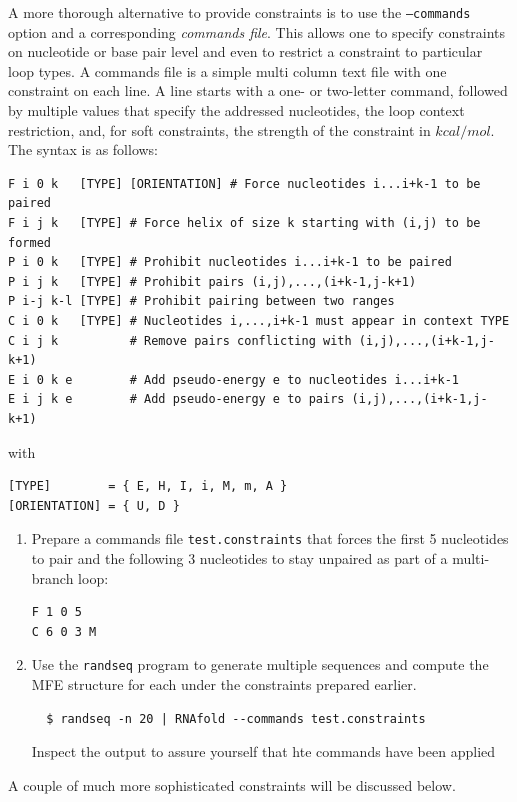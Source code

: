 \documentclass[a4paper]{article}
\begin{document}
A more thorough alternative to provide constraints is to use the \texttt{--commands} option
and a corresponding \textit{commands file}. This allows one to specify constraints on nucleotide
or base pair level and even to restrict a constraint to particular loop types. A commands file
is a simple multi column text file with one constraint on each line. A line starts with a one- or
two-letter command, followed by multiple values that specify the addressed nucleotides, the loop
context restriction, and, for soft constraints, the strength of the constraint in $kcal/mol$.
The syntax is as follows:

{\footnotesize
\begin{verbatim}
F i 0 k   [TYPE] [ORIENTATION] # Force nucleotides i...i+k-1 to be paired
F i j k   [TYPE] # Force helix of size k starting with (i,j) to be formed
P i 0 k   [TYPE] # Prohibit nucleotides i...i+k-1 to be paired
P i j k   [TYPE] # Prohibit pairs (i,j),...,(i+k-1,j-k+1)
P i-j k-l [TYPE] # Prohibit pairing between two ranges
C i 0 k   [TYPE] # Nucleotides i,...,i+k-1 must appear in context TYPE
C i j k          # Remove pairs conflicting with (i,j),...,(i+k-1,j-k+1)
E i 0 k e        # Add pseudo-energy e to nucleotides i...i+k-1
E i j k e        # Add pseudo-energy e to pairs (i,j),...,(i+k-1,j-k+1)
\end{verbatim}
}
with
{\footnotesize
\begin{verbatim}
[TYPE]        = { E, H, I, i, M, m, A }
[ORIENTATION] = { U, D }
\end{verbatim}    
}

\begin{enumerate}
\item Prepare a commands file \texttt{test.constraints} that forces the first 5 nucleotides to pair and the
following 3 nucleotides to stay unpaired as part of a multi-branch loop:
\begin{verbatim}
F 1 0 5
C 6 0 3 M
\end{verbatim}
\item Use the \texttt{randseq} program to generate multiple sequences and compute the MFE structure
for each under the constraints prepared earlier.
\begin{verbatim}
  $ randseq -n 20 | RNAfold --commands test.constraints
\end{verbatim}
Inspect the output to assure yourself that hte commands have been applied
\end{enumerate}

A couple of much more sophisticated constraints will be discussed below.
\end{document}
